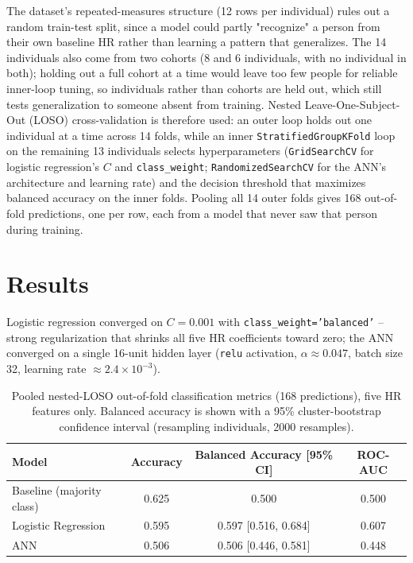 \documentclass[11pt,a4paper]{article}
\begin{document}
The dataset's repeated-measures structure (12 rows per individual) rules out a random train-test split, since a model could partly "recognize" a person from their own baseline HR rather than learning a pattern that generalizes. The 14 individuals also come from two cohorts (8 and 6 individuals, with no individual in both); holding out a full cohort at a time would leave too few people for reliable inner-loop tuning, so individuals rather than cohorts are held out, which still tests generalization to someone absent from training. Nested Leave-One-Subject-Out (LOSO) cross-validation is therefore used: an outer loop holds out one individual at a time across 14 folds, while an inner \texttt{StratifiedGroupKFold} loop on the remaining 13 individuals selects hyperparameters (\texttt{GridSearchCV} for logistic regression's $C$ and \texttt{class\_weight}; \texttt{RandomizedSearchCV} for the ANN's architecture and learning rate) and the decision threshold that maximizes balanced accuracy on the inner folds. Pooling all 14 outer folds gives 168 out-of-fold predictions, one per row, each from a model that never saw that person during training.

\section{Results}

Logistic regression converged on $C=0.001$ with \texttt{class\_weight='balanced'} -- strong regularization that shrinks all five HR coefficients toward zero; the ANN converged on a single 16-unit hidden layer (\texttt{relu} activation, $\alpha \approx 0.047$, batch size 32, learning rate $\approx 2.4\times10^{-3}$).

\begin{table}[H]
\centering
\caption{Pooled nested-LOSO out-of-fold classification metrics (168 predictions), five HR features only. Balanced accuracy is shown with a 95\% cluster-bootstrap confidence interval (resampling individuals, 2000 resamples).}
\vspace{0.1cm}
\begin{tabular}{lccc}
\toprule
Model & Accuracy & Balanced Accuracy [95\% CI] & ROC-AUC \\
\midrule
Baseline (majority class) & 0.625 & 0.500 & 0.500 \\
Logistic Regression & 0.595 & 0.597 [0.516, 0.684] & 0.607 \\
ANN                  & 0.506 & 0.506 [0.446, 0.581] & 0.448 \\
\bottomrule
\end{tabular}
\end{table}
\end{document}
